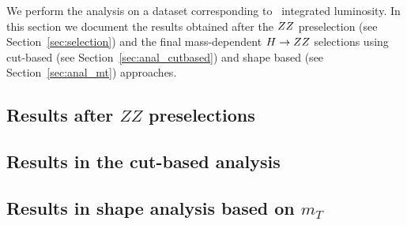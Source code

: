 We perform the analysis on a dataset corresponding to \intlumi\ integrated luminosity. 
In this section we document the results obtained after the $ZZ$ preselection (see 
Section~\ref{sec:selection}) and the final mass-dependent $H\to ZZ$ selections using cut-based 
(see Section~\ref{sec:anal_cutbased}) and shape based (see Section~\ref{sec:anal_mt}) approaches. 


\subsection{Results after $ZZ$ preselections}
\label{sec:results_zzpresel}

\clearpage

\subsection{Results in the cut-based analysis}
\label{sec:results_cut}

\clearpage

\subsection{Results in shape analysis based on $m_T$}
\label{sec:results_mtshape}

\clearpage
 